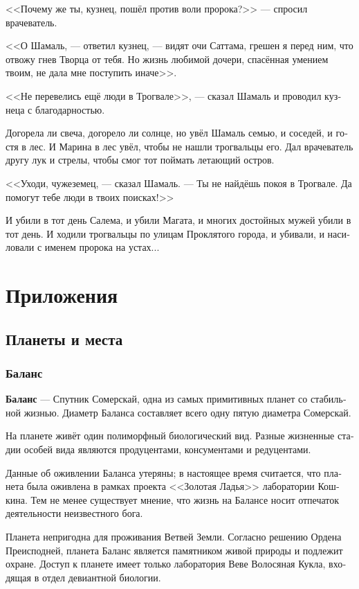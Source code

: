 \documentclass[a4paper,12pt,fleqn]{book}\usepackage{cooltooltips}\usepackage{polyglossia}\setdefaultlanguage[babelshorthands=true]{russian}\setotherlanguage{english}\defaultfontfeatures{Ligatures=TeX,Mapping=tex-text} \usepackage{xcolor}\definecolor{lightgray}{HTML}{bbbbbb}\color{lightgray}\newcommand{\ml}[3]{\textenglish{\textcolor{black}{#3}}}
\newcommand{\theterm}[3]{\textbf{\hypertarget{#1}{#2}} --- #3}
\begin{document}
<<Почему же ты, кузнец, пошёл против воли пророка?>> --- спросил врачеватель.

<<О Шамаль, --- ответил кузнец, --- видят очи Саттама, грешен я перед ним, что отвожу гнев Творца от тебя.
Но жизнь любимой дочери, спасённая умением твоим, не дала мне поступить иначе>>.

<<Не перевелись ещё люди в Трогвале>>, --- сказал Шамаль и проводил кузнеца с благодарностью.

Догорела ли свеча, догорело ли солнце, но увёл Шамаль семью, и соседей, и гостя в лес.
И Марина в лес увёл, чтобы не нашли трогвальцы его.
Дал врачеватель другу лук и стрелы, чтобы смог тот поймать летающий остров.

<<Уходи, чужеземец, --- сказал Шамаль.
--- Ты не найдёшь покоя в Трогвале.
Да помогут тебе люди в твоих поисках!>>

И убили в тот день Салема, и убили Магата, и многих достойных мужей убили в тот день.
И ходили трогвальцы по улицам Проклятого города, и убивали, и насиловали с именем пророка на устах...

\part*{Приложения}

\appendix

\chapter{Планеты и места}

\section{Баланс}
 
\theterm{balance}
{Баланс}
{Спутник Сомерскай, одна из самых примитивных планет со стабильной жизнью.
Диаметр Баланса составляет всего одну пятую диаметра Сомерскай.

На планете живёт один полиморфный биологический вид.
Разные жизненные стадии особей вида являются продуцентами, консументами и редуцентами.

Данные об оживлении Баланса утеряны;
в настоящее время считается, что планета была оживлена в рамках проекта <<Золотая Ладья>> лаборатории Кошкина.
Тем не менее существует мнение, что жизнь на Балансе носит отпечаток деятельности неизвестного бога.

Планета непригодна для проживания Ветвей Земли.
Согласно решению Ордена Преисподней, планета Баланс является памятником живой природы и подлежит охране.
Доступ к планете имеет только лаборатория Веве Волосяная Кукла, входящая в отдел девиантной биологии.}
\end{document}
